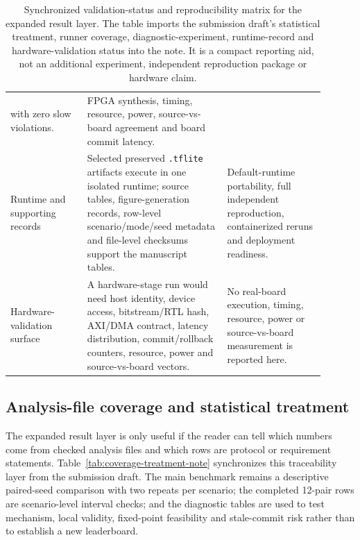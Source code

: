 \documentclass[11pt]{article}
\begin{document}
\begin{table}[ht]
\begin{tabular}{>{\raggedright\arraybackslash}p{0.22\linewidth}
                >{\raggedright\arraybackslash}p{0.40\linewidth}
                >{\raggedright\arraybackslash}p{0.28\linewidth}}
with zero slow violations. & FPGA synthesis, timing, resource, power,
source-vs-board agreement and board commit latency. \\
\addlinespace
Runtime and supporting records & Selected preserved \texttt{.tflite} artifacts
execute in one isolated runtime; source tables, figure-generation records,
row-level scenario/mode/seed metadata and file-level checksums support the
manuscript tables. & Default-runtime portability, full independent
reproduction, containerized reruns and deployment readiness. \\
\addlinespace
Hardware-validation surface & A hardware-stage run would need host identity,
device access, bitstream/RTL hash, AXI/DMA contract, latency distribution,
commit/rollback counters, resource, power and source-vs-board vectors. & No
real-board execution, timing, resource, power or source-vs-board measurement is
reported here. \\
\bottomrule
\end{tabular}
\caption{Synchronized validation-status and reproducibility matrix for the
expanded result layer.  The table imports the submission draft's statistical
treatment, runner coverage, diagnostic-experiment, runtime-record and
hardware-validation status into the note.  It is a compact reporting aid, not
an additional experiment, independent reproduction package or hardware claim.}
\label{tab:validation-status-note}
\end{table}

\subsection{Analysis-file coverage and statistical treatment}

The expanded result layer is only useful if the reader can tell which numbers
come from checked analysis files and which rows are protocol or requirement
statements.  Table~\ref{tab:coverage-treatment-note} synchronizes this
traceability layer from the submission draft.  The main benchmark remains a
descriptive paired-seed comparison with two repeats per scenario; the completed
12-pair rows are scenario-level interval checks; and the diagnostic tables are
used to test mechanism, local validity, fixed-point feasibility and stale-commit
risk rather than to establish a new leaderboard.
\end{document}
